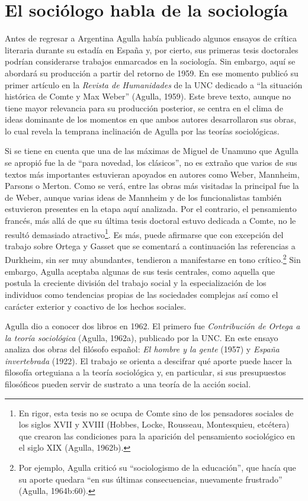 \section{El sociólogo habla de la sociología}

Antes de regresar a Argentina Agulla había publicado algunos ensayos de crítica literaria durante su estadía en España y, por cierto, sus primeras tesis doctorales podrían considerarse trabajos enmarcados en la sociología. Sin embargo, aquí se abordará su producción a partir del retorno de 1959. En ese momento publicó su primer artículo en la \emph{Revista de Humanidades} de la UNC dedicado a ``la situación histórica de Comte y Max Weber'' (Agulla, 1959). Este breve texto, aunque no tiene mayor relevancia para su producción posterior, se centra en el clima de ideas dominante de los momentos en que ambos autores desarrollaron sus obras, lo cual revela la temprana inclinación de Agulla por las teorías sociológicas.

Si se tiene en cuenta que una de las máximas de Miguel de Unamuno que Agulla se apropió fue la de ``para novedad, los clásicos'', no es extraño que varios de sus textos más importantes estuvieran apoyados en autores como Weber, Mannheim, Parsons o Merton. Como se verá, entre las obras más visitadas la principal fue la de Weber, aunque varias ideas de Mannheim y de los funcionalistas también estuvieron presentes en la etapa aquí analizada. Por el contrario, el pensamiento francés, más allá de que su última tesis doctoral estuvo dedicada a Comte, no le resultó demasiado atractivo\footnote{En rigor, esta tesis no se ocupa de Comte sino de los pensadores sociales de los siglos XVII y XVIII (Hobbes, Locke, Rousseau, Montesquieu, etcétera) que crearon las condiciones para la aparición del pensamiento sociológico en el siglo XIX (Agulla, 1962b).}. Es más, puede afirmarse que con excepción del trabajo sobre Ortega y Gasset que se comentará a continuación las referencias a Durkheim, sin ser muy abundantes, tendieron a manifestarse en tono crítico.\footnote{Por ejemplo, Agulla criticó su ``sociologismo de la educación'', que hacía que su aporte quedara ``en sus últimas consecuencias, nuevamente frustrado'' (Agulla, 1964b:60).} Sin embargo, Agulla aceptaba algunas de sus tesis centrales, como aquella que postula la creciente división del trabajo social y la especialización de los individuos como tendencias propias de las sociedades complejas así como el carácter exterior y coactivo de los hechos sociales.

Agulla dio a conocer dos libros en 1962. El primero fue \emph{Contribución de Ortega a la teoría sociológica} (Agulla, 1962a), publicado por la UNC. En este ensayo analiza dos obras del filósofo español: \emph{El hombre y la gente} (1957) y \emph{España invertebrada} (1922). El trabajo se orienta a descifrar qué aporte puede hacer la filosofía orteguiana a la teoría sociológica y, en particular, si sus presupuestos filosóficos pueden servir de sustrato a una teoría de la acción social.

